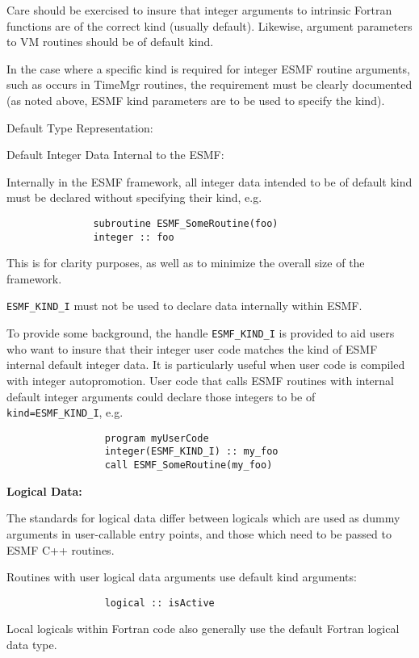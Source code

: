 Care should be exercised to insure that integer arguments to intrinsic Fortran functions are of the correct kind (usually default). Likewise, argument parameters to VM routines should be of default kind.

In the case where a specific kind is required for integer ESMF routine arguments, such as occurs in TimeMgr routines, the requirement must be clearly documented (as noted above, ESMF kind parameters are to be used to specify the kind).

Default Type Representation:

Default Integer Data Internal to the ESMF:

Internally in the ESMF framework, all integer data intended to be of default kind must be declared without specifying their kind, e.g.
\begin{verbatim}
               subroutine ESMF_SomeRoutine(foo)
               integer :: foo
\end{verbatim}
This is for clarity purposes, as well as to minimize the overall size of the framework.

{\tt ESMF\_KIND\_I} must not be used to declare data internally within ESMF.

To provide some background, the handle {\tt ESMF\_KIND\_I} is provided to aid users who want to insure that their integer user code matches the kind of ESMF internal default integer data. It is particularly useful when user code is compiled with integer autopromotion. User code that calls ESMF routines with internal default integer arguments could declare those integers to be of {\tt kind=ESMF\_KIND\_I}, e.g.
\begin{verbatim}
                 program myUserCode
                 integer(ESMF_KIND_I) :: my_foo
                 call ESMF_SomeRoutine(my_foo)
\end{verbatim}

{\bf Logical Data:}

The standards for logical data differ between logicals which are used as dummy arguments in user-callable entry points, and those which need to be passed
to ESMF C++ routines.

Routines with user logical data arguments use default kind arguments:
\begin{verbatim}
                 logical :: isActive
\end{verbatim}

Local logicals within Fortran code also generally use the default Fortran logical data type.

